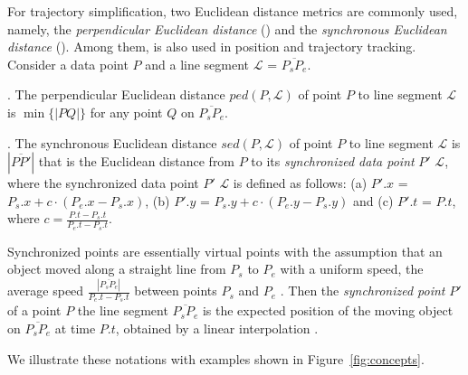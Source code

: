 For trajectory simplification, two Euclidean distance metrics are commonly used, namely, the \emph{perpendicular Euclidean distance} (\ped) and the \emph{synchronous Euclidean distance} \cite{Meratnia:Spatiotemporal} (\sed). Among them, \sed is also used in position and trajectory tracking.
%
Consider a data point $P$ and a line segment $\mathcal{L}$ = $\overline{P_{s}P_{e}}$.

. The perpendicular Euclidean distance $ped\left(P, \mathcal{L}\right)$ of point $P$ to line segment $\mathcal{L}$ is $\min\{|PQ|\}$ for any point $Q$ on $\overline{P_{s}P_{e}}$.

. The synchronous Euclidean distance $sed\left(P, \mathcal{L}\right)$ of point $P$ to line segment $\mathcal{L}$ is $|\overline{PP'}|$ that is the Euclidean distance from $P$ to its \textit{synchronized data point} $P'$ \wrt $\mathcal{L}$, where the synchronized data point $P'$ \wrt $\mathcal{L}$ is defined as follows:
(a) $P'.x$ = $P_s.x +  c\cdot\left(P_e.x - P_s.x\right)$,
(b) $P'.y$ = $P_s.y +  c\cdot\left(P_e.y - P_s.y\right)$ and
(c) $P'.t$ = $P.t$, where $c= \frac{P.t-P_s.t}{P_e.t-P_s.t}$.

Synchronized points are essentially virtual points with the assumption that an object moved along a straight line from $P_s$ to $P_e$ with a uniform speed, \ie the average speed $\frac{|\overline{P_sP_e}|}{P_e.t-P_s.t}$ between points $P_s$ and $P_e$ \cite{Cao:Spatio,Lin:Cised}. Then the \emph{synchronized point} $P'$ of a point $P$ \wrt the line segment $\overline{P_sP_e}$ is the expected position of the moving object on $\overline{P_sP_e}$ at time $P.t$, obtained by a linear interpolation \cite{Cao:Spatio}. 


We illustrate these notations with examples shown in {Figure}~\ref{fig:concepts}.



